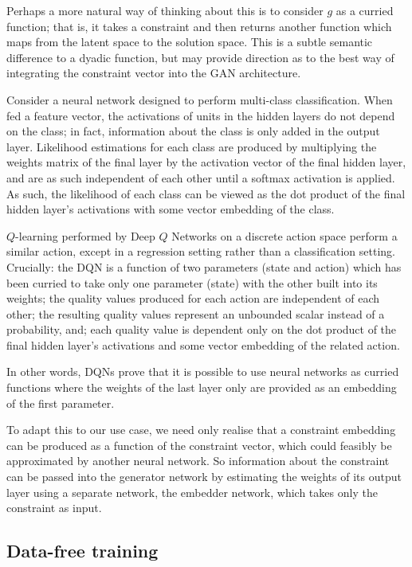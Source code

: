 \documentclass[../../main.tex]{subfiles}
\begin{document}
Perhaps a more natural way of thinking about this is to consider $g$ as a curried function; that is, it takes a constraint and then returns another function which maps from the latent space to the solution space.
This is a subtle semantic difference to a dyadic function, but may provide direction as to the best way of integrating the constraint vector into the GAN architecture.

Consider a neural network designed to perform multi-class classification.
When fed a feature vector, the activations of units in the hidden layers do not depend on the class; in fact, information about the class is only added in the output layer.
Likelihood estimations for each class are produced by multiplying the weights matrix of the final layer by the activation vector of the final hidden layer, and are as such independent of each other until a softmax activation is applied.
As such, the likelihood of each class can be viewed as the dot product of the final hidden layer's activations with some vector embedding of the class.

$Q$-learning performed by Deep $Q$ Networks on a discrete action space perform a similar action, except in a regression setting rather than a classification setting.
Crucially: the DQN is a function of two parameters (state and action) which has been curried to take only one parameter (state) with the other built into its weights; the quality values produced for each action are independent of each other; the resulting quality values represent an unbounded scalar instead of a probability, and; each quality value is dependent only on the dot product of the final hidden layer's activations and some vector embedding of the related action.

In other words, DQNs prove that it is possible to use neural networks as curried functions where the weights of the last layer only are provided as an embedding of the first parameter.

To adapt this to our use case, we need only realise that a constraint embedding can be produced as a function of the constraint vector, which could feasibly be approximated by another neural network.
So information about the constraint can be passed into the generator network by estimating the weights of its output layer using a separate network, the embedder network, which takes only the constraint as input.

\subsection{Data-free training}
\end{document}
